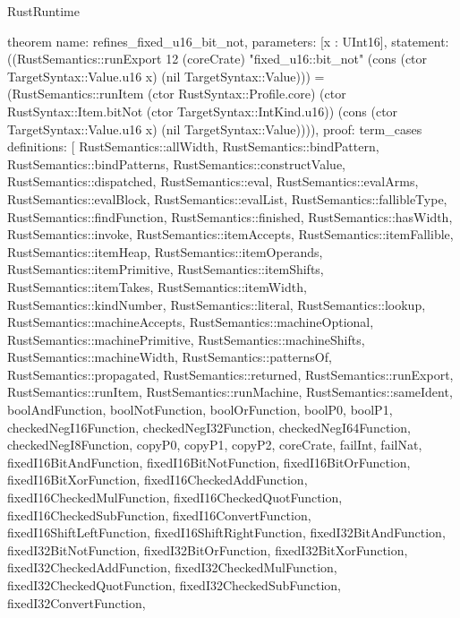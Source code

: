 \begin{lexlean}{RustRuntime}
\begin{semanticmodule}
theorem{
  name: refines_fixed_u16_bit_not,
  parameters: [x : UInt16],
  statement: ((RustSemantics::runExport 12 (coreCrate) "fixed_u16::bit_not" (cons (ctor TargetSyntax::Value.u16 x) (nil TargetSyntax::Value))) = (RustSemantics::runItem (ctor RustSyntax::Profile.core) (ctor RustSyntax::Item.bitNot (ctor TargetSyntax::IntKind.u16)) (cons (ctor TargetSyntax::Value.u16 x) (nil TargetSyntax::Value)))),
  proof: term_cases{
    definitions: [
      RustSemantics::allWidth,
      RustSemantics::bindPattern,
      RustSemantics::bindPatterns,
      RustSemantics::constructValue,
      RustSemantics::dispatched,
      RustSemantics::eval,
      RustSemantics::evalArms,
      RustSemantics::evalBlock,
      RustSemantics::evalList,
      RustSemantics::fallibleType,
      RustSemantics::findFunction,
      RustSemantics::finished,
      RustSemantics::hasWidth,
      RustSemantics::invoke,
      RustSemantics::itemAccepts,
      RustSemantics::itemFallible,
      RustSemantics::itemHeap,
      RustSemantics::itemOperands,
      RustSemantics::itemPrimitive,
      RustSemantics::itemShifts,
      RustSemantics::itemTakes,
      RustSemantics::itemWidth,
      RustSemantics::kindNumber,
      RustSemantics::literal,
      RustSemantics::lookup,
      RustSemantics::machineAccepts,
      RustSemantics::machineOptional,
      RustSemantics::machinePrimitive,
      RustSemantics::machineShifts,
      RustSemantics::machineWidth,
      RustSemantics::patternsOf,
      RustSemantics::propagated,
      RustSemantics::returned,
      RustSemantics::runExport,
      RustSemantics::runItem,
      RustSemantics::runMachine,
      RustSemantics::sameIdent,
      boolAndFunction,
      boolNotFunction,
      boolOrFunction,
      boolP0,
      boolP1,
      checkedNegI16Function,
      checkedNegI32Function,
      checkedNegI64Function,
      checkedNegI8Function,
      copyP0,
      copyP1,
      copyP2,
      coreCrate,
      failInt,
      failNat,
      fixedI16BitAndFunction,
      fixedI16BitNotFunction,
      fixedI16BitOrFunction,
      fixedI16BitXorFunction,
      fixedI16CheckedAddFunction,
      fixedI16CheckedMulFunction,
      fixedI16CheckedQuotFunction,
      fixedI16CheckedSubFunction,
      fixedI16ConvertFunction,
      fixedI16ShiftLeftFunction,
      fixedI16ShiftRightFunction,
      fixedI32BitAndFunction,
      fixedI32BitNotFunction,
      fixedI32BitOrFunction,
      fixedI32BitXorFunction,
      fixedI32CheckedAddFunction,
      fixedI32CheckedMulFunction,
      fixedI32CheckedQuotFunction,
      fixedI32CheckedSubFunction,
      fixedI32ConvertFunction,
}}
\end{semanticmodule}
\end{lexlean}
